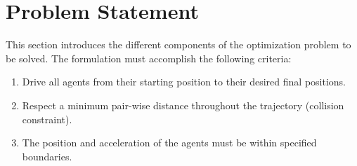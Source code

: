 \section{Problem Statement}
\label{sec:formulation}

This section introduces the different components of the optimization problem to be solved. The formulation must accomplish the following criteria:
\begin{enumerate}
	\item Drive all agents from their starting position to their desired final positions.
	\item Respect a minimum pair-wise distance throughout the trajectory (collision constraint).
	\item The position and acceleration of the agents must be within specified boundaries.
\end{enumerate}

